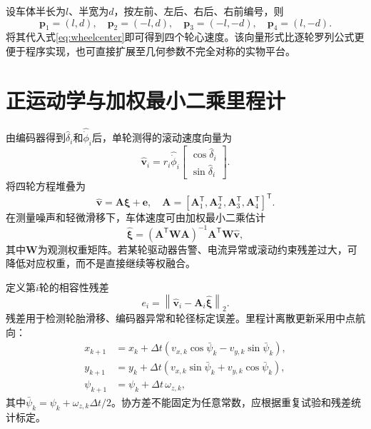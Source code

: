 \documentclass[UTF8,openany,12pt,a4paper]{ctexrep}
\newcommand{\trans}{^{\mathsf T}}
\begin{document}
设车体半长为$l$、半宽为$d$，按左前、左后、右后、右前编号，则
\begin{equation}
\bm p_1=(l,d),\quad \bm p_2=(-l,d),\quad \bm p_3=(-l,-d),\quad \bm p_4=(l,-d).
\end{equation}
将其代入式\eqref{eq:wheelcenter}即可得到四个轮心速度。该向量形式比逐轮罗列公式更便于程序实现，也可直接扩展至几何参数不完全对称的实物平台。

\section{正运动学与加权最小二乘里程计}
由编码器得到$\hat\delta_i$和$\hat{\dot\phi}_i$后，单轮测得的滚动速度向量为
\begin{equation}
\hat{\bm v}_i=r_i\hat{\dot\phi}_i\begin{bmatrix}\cos\hat\delta_i\\\sin\hat\delta_i\end{bmatrix}.
\end{equation}
将四轮方程堆叠为
\begin{equation}
\hat{\bm v}=\bm A\bm\xi+\bm e,\quad
\bm A=[\bm A_1\trans,\bm A_2\trans,\bm A_3\trans,\bm A_4\trans]\trans.
\end{equation}
在测量噪声和轻微滑移下，车体速度可由加权最小二乘估计
\begin{equation}
\hat{\bm\xi}=(\bm A\trans\bm W\bm A)^{-1}\bm A\trans\bm W\hat{\bm v},
\label{eq:wls}
\end{equation}
其中$\bm W$为观测权重矩阵。若某轮驱动器告警、电流异常或滚动约束残差过大，可降低对应权重，而不是直接继续等权融合。

定义第$i$轮的相容性残差
\begin{equation}e_i=\left\|\hat{\bm v}_i-\bm A_i\hat{\bm\xi}\right\|_2.\end{equation}
残差用于检测轮胎滑移、编码器异常和轮径标定误差。里程计离散更新采用中点航向：
\begin{align}
x_{k+1}&=x_k+\Delta t(v_{x,k}\cos\bar\psi_k-v_{y,k}\sin\bar\psi_k),\\
y_{k+1}&=y_k+\Delta t(v_{x,k}\sin\bar\psi_k+v_{y,k}\cos\bar\psi_k),\\
\psi_{k+1}&=\psi_k+\Delta t\,\omega_{z,k},
\end{align}
其中$\bar\psi_k=\psi_k+\omega_{z,k}\Delta t/2$。协方差不能固定为任意常数，应根据重复试验和残差统计标定。
\end{document}
